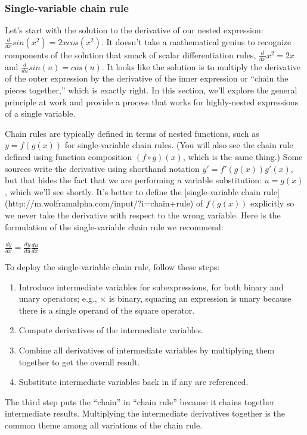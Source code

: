 \documentclass[11pt]{article}
\begin{document}
\subsubsection{Single-variable chain rule}

Let's start with the solution to the derivative of our nested expression: $\frac{d}{dx} sin(x^2) = 2xcos(x^2)$.  It doesn't take a mathematical genius to recognize components of the solution that smack of scalar differentiation rules, $\frac{d}{dx}x^2 = 2x$ and $\frac{d}{du} sin(u) = cos(u)$. It looks like the solution is to multiply the derivative of the outer expression by the derivative of the inner expression or ``chain the pieces together,'' which is exactly right. In this section, we'll explore the general principle at work and provide a process that works for highly-nested expressions of a single variable.

Chain rules are typically defined in terms of nested functions, such as $y = f(g(x))$ for single-variable chain rules. (You will also see the chain rule defined using function composition $(f \circ g)(x)$, which is the same thing.)  Some sources write the derivative using shorthand notation $y' = f'(g(x))g'(x)$, but that hides the fact that we are performing a variable substitution: $u = g(x)$, which we'll see shortly. It's better to define the [single-variable chain rule](http://m.wolframalpha.com/input/?i=chain+rule) of $f(g(x))$ explicitly so we never take the derivative with respect to the wrong variable. Here is the formulation of the single-variable chain rule we recommend:

$\frac{dy}{dx} = \frac{dy}{du}\frac{du}{dx}$

To deploy the single-variable chain rule, follow these steps:

\begin{enumerate}
	\item  Introduce intermediate variables for subexpressions, for both binary and unary operators; e.g., $\times$ is binary, squaring an expression is unary because there is a single operand of the square operator.
	\item Compute derivatives of the intermediate variables.
	\item Combine all derivatives of intermediate variables by multiplying them together to get the overall result.
	\item Substitute intermediate variables back in if any are referenced.
\end{enumerate}

The third step puts the ``chain'' in ``chain rule'' because it chains together intermediate results. Multiplying the intermediate derivatives together is the common theme among all variations of the chain rule.
\end{document}
